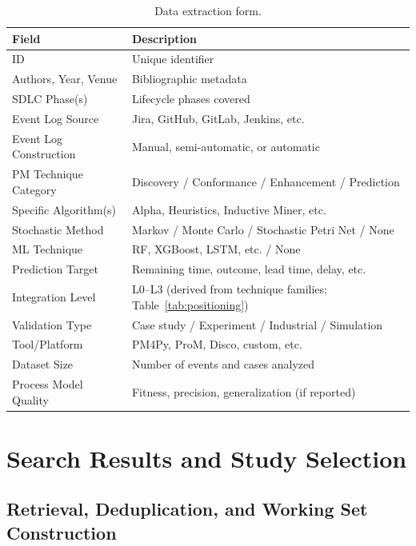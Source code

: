 \begin{table}[htbp]
\centering
\caption{Data extraction form.}
\label{tab:extraction}
\small
\setlength{\tabcolsep}{4pt}
\begin{tabular}{p{3.6cm} p{8.1cm}}
\toprule
\textbf{Field} & \textbf{Description} \\
\midrule
ID                           & Unique identifier \\
Authors, Year, Venue         & Bibliographic metadata \\
SDLC Phase(s)                & Lifecycle phases covered \\
Event Log Source             & Jira, GitHub, GitLab, Jenkins, etc. \\
Event Log Construction       & Manual, semi-automatic, or automatic \\
PM Technique Category        & Discovery / Conformance / Enhancement / Prediction \\
Specific Algorithm(s)        & Alpha, Heuristics, Inductive Miner, etc. \\
Stochastic Method            & Markov / Monte Carlo / Stochastic Petri Net / None \\
ML Technique                 & RF, XGBoost, LSTM, etc. / None \\
Prediction Target            & Remaining time, outcome, lead time, delay, etc. \\
Integration Level            & L0--L3 (derived from technique families; Table~\ref{tab:positioning}) \\
Validation Type              & Case study / Experiment / Industrial / Simulation \\
Tool/Platform                & PM4Py, ProM, Disco, custom, etc. \\
Dataset Size                 & Number of events and cases analyzed \\
Process Model Quality        & Fitness, precision, generalization (if reported) \\
\bottomrule
\end{tabular}
\end{table}


\section{Search Results and Study Selection}
\label{sec:slr-results-selection}

\subsection{Retrieval, Deduplication, and Working Set Construction}

